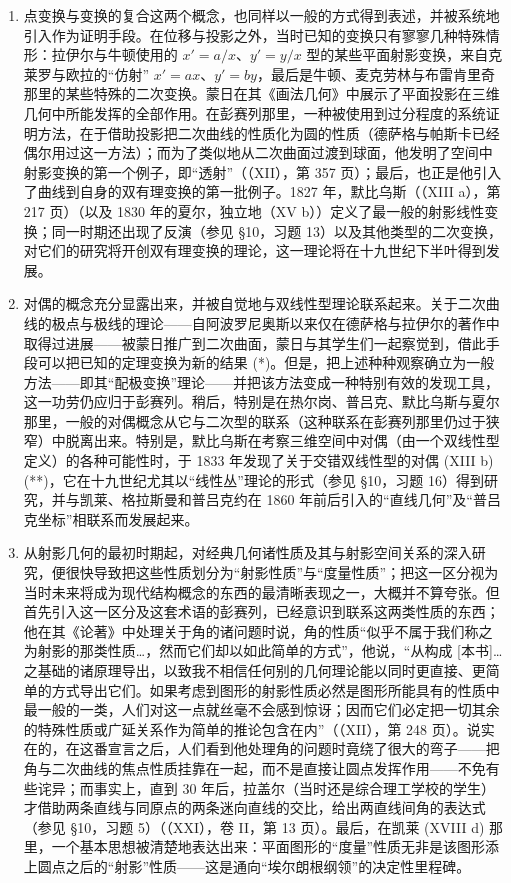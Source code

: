 \begin{enumerate}
\def\labelenumi{\Alph{enumi})}
\setcounter{enumi}{2}
\item
  点变换与变换的复合这两个概念，也同样以一般的方式得到表述，并被系统地引入作为证明手段。在位移与投影之外，当时已知的变换只有寥寥几种特殊情形：拉伊尔与牛顿使用的 \(x' = a/x\)、\(y' = y/x\) 型的某些平面射影变换，来自克莱罗与欧拉的“仿射” \(x' = ax\)、\(y' = by\)，最后是牛顿、麦克劳林与布雷肯里奇那里的某些特殊的二次变换。蒙日在其《画法几何》中展示了平面投影在三维几何中所能发挥的全部作用。在彭赛列那里，一种被使用到过分程度的系统证明方法，在于借助投影把二次曲线的性质化为圆的性质（德萨格与帕斯卡已经偶尔用过这一方法）；而为了类似地从二次曲面过渡到球面，他发明了空间中射影变换的第一个例子，即“透射”（（XII），第 357 页）；最后，也正是他引入了曲线到自身的双有理变换的第一批例子。1827 年，默比乌斯（（XIII a），第 217 页）（以及 1830 年的夏尔，独立地（XV b））定义了最一般的射影线性变换；同一时期还出现了反演（参见 §10，习题 13）以及其他类型的二次变换，对它们的研究将开创双有理变换的理论，这一理论将在十九世纪下半叶得到发展。
\item
  对偶的概念充分显露出来，并被自觉地与双线性型理论联系起来。关于二次曲线的极点与极线的理论——自阿波罗尼奥斯以来仅在德萨格与拉伊尔的著作中取得过进展——被蒙日推广到二次曲面，蒙日与其学生们一起察觉到，借此手段可以把已知的定理变换为新的结果 (*)。但是，把上述种种观察确立为一般方法——即其“配极变换”理论——并把该方法变成一种特别有效的发现工具，这一功劳仍应归于彭赛列。稍后，特别是在热尔岗、普吕克、默比乌斯与夏尔那里，一般的对偶概念从它与二次型的联系（这种联系在彭赛列那里仍过于狭窄）中脱离出来。特别是，默比乌斯在考察三维空间中对偶（由一个双线性型定义）的各种可能性时，于 1833 年发现了关于交错双线性型的对偶 (XIII b) (**)，它在十九世纪尤其以“线性丛”理论的形式（参见 §10，习题 16）得到研究，并与凯莱、格拉斯曼和普吕克约在 1860 年前后引入的“直线几何”及“普吕克坐标”相联系而发展起来。
\item
  从射影几何的最初时期起，对经典几何诸性质及其与射影空间关系的深入研究，便很快导致把这些性质划分为“射影性质”与“度量性质”；把这一区分视为当时未来将成为现代结构概念的东西的最清晰表现之一，大概并不算夸张。但首先引入这一区分及这套术语的彭赛列，已经意识到联系这两类性质的东西；他在其《论著》中处理关于角的诸问题时说，角的性质“似乎不属于我们称之为射影的那类性质\ldots，然而它们却以如此简单的方式”，他说，“从构成 {[}本书{]}\ldots 之基础的诸原理导出，以致我不相信任何别的几何理论能以同时更直接、更简单的方式导出它们。如果考虑到图形的射影性质必然是图形所能具有的性质中最一般的一类，人们对这一点就丝毫不会感到惊讶；因而它们必定把一切其余的特殊性质或广延关系作为简单的推论包含在内”（（XII），第 248 页）。说实在的，在这番宣言之后，人们看到他处理角的问题时竟绕了很大的弯子——把角与二次曲线的焦点性质挂靠在一起，而不是直接让圆点发挥作用——不免有些诧异；而事实上，直到 30 年后，拉盖尔（当时还是综合理工学校的学生）才借助两条直线与同原点的两条迷向直线的交比，给出两直线间角的表达式（参见 §10，习题 5）（（XXI），卷 II，第 13 页）。最后，在凯莱 (XVIII d) 那里，一个基本思想被清楚地表达出来：平面图形的“度量”性质无非是该图形添上圆点之后的“射影”性质——这是通向“埃尔朗根纲领”的决定性里程碑。

\end{enumerate}
